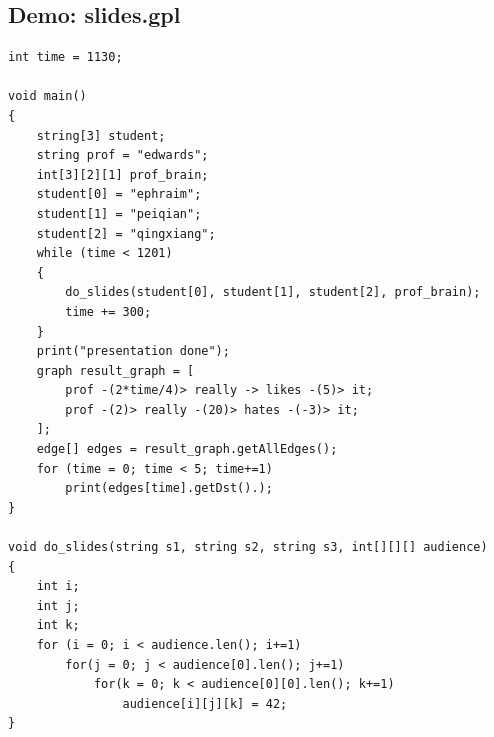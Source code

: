 \documentclass[a4paper,12pt]{article}
\begin{document}
\subsection{Demo: slides.gpl}
\begin{lstlisting}
int time = 1130;

void main()
{
	string[3] student;
	string prof = "edwards";
	int[3][2][1] prof_brain;
	student[0] = "ephraim";
	student[1] = "peiqian";
	student[2] = "qingxiang";
	while (time < 1201)
	{
		do_slides(student[0], student[1], student[2], prof_brain);
		time += 300;
	}
	print("presentation done");
	graph result_graph = [
		prof -(2*time/4)> really -> likes -(5)> it;
		prof -(2)> really -(20)> hates -(-3)> it;
	];
	edge[] edges = result_graph.getAllEdges();
	for (time = 0; time < 5; time+=1)
		print(edges[time].getDst().);
}

void do_slides(string s1, string s2, string s3, int[][][] audience)
{
	int i;
	int j;
	int k;
	for (i = 0; i < audience.len(); i+=1)
		for(j = 0; j < audience[0].len(); j+=1)
			for(k = 0; k < audience[0][0].len(); k+=1)
				audience[i][j][k] = 42;
}
\end{lstlisting}
\end{document}
